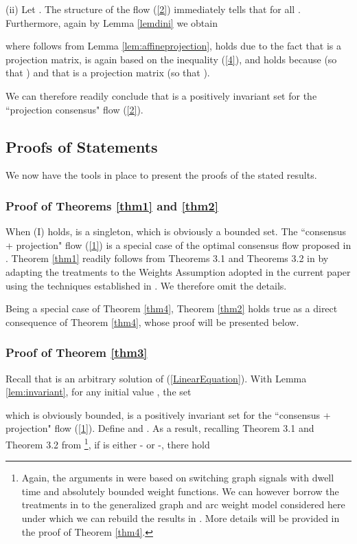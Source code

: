 \documentclass[a4paper, 11pt]{article}
\begin{document}
\noindent(ii) Let . The structure of the flow (\ref{2}) immediately tells that  for all .  Furthermore, again by Lemma \ref{lemdini} we obtain

where  follows from Lemma \ref{lem:affineprojection},  holds due to the fact that  is a projection  matrix,  is again based on the inequality (\ref{4}), and  holds because  (so that ) and   that   is a projection  matrix (so that ).

We can therefore readily conclude that  is a positively invariant set for the ``projection consensus" flow (\ref{2}). \hfill

\subsection{Proofs of Statements}
We  now have the tools in place to present the proofs of the stated results.
\subsubsection{Proof of Theorems \ref{thm1} and \ref{thm2}}
When (I) holds,  is a singleton, which is obviously a bounded set. The ``consensus + projection" flow (\ref{1}) is a special case of the optimal consensus flow proposed in \cite{shitac}. Theorem \ref{thm1} readily follows  from Theorems 3.1 and Theorems 3.2 in \cite{shitac} by adapting the treatments to the Weights Assumption adopted  in the current paper using the techniques established in \cite{shisiam}. We therefore omit the details.

Being a special case of  Theorem \ref{thm4},  Theorem \ref{thm2} holds true as a direct consequence of Theorem \ref{thm4}, whose proof will be presented below.

\subsubsection{Proof of Theorem \ref{thm3}}
Recall that   is  an arbitrary solution of (\ref{LinearEquation}). With Lemma \ref{lem:invariant}, for any initial value ,   the set

which  is  obviously bounded, is a positively invariant set for the ``consensus + projection" flow (\ref{1}). Define 
and .  As a result,  recalling  Theorem 3.1 and Theorem 3.2 from \cite{shitac}\footnote{Again, the arguments in \cite{shitac} were based on switching graph signals with dwell time and absolutely bounded weight functions. We can however borrow the treatments in \cite{shisiam} to the generalized graph and arc weight model considered here under which we can rebuild the results in \cite{shitac}. More details will be provided in the proof of Theorem \ref{thm4}.   }, if  is either  - or -, there hold
\end{document}
